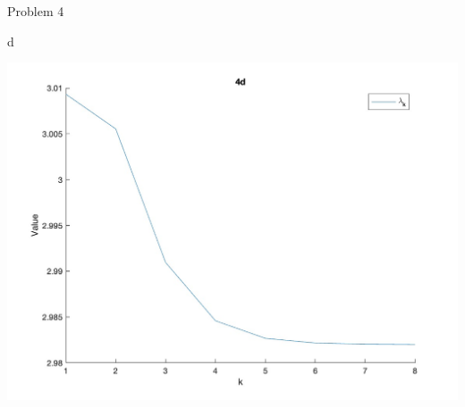 \begin{section}{Problem 4}
\begin{solution}{d}
        \begin{mdframed}
            \includegraphics[scale=0.33]{DevamSisodraker_4d.jpg}
        \end{mdframed}
    \end{solution}
\end{section}